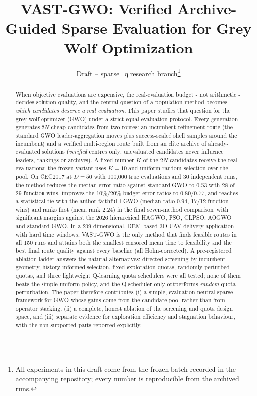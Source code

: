 \documentclass[journal]{IEEEtran}
\begin{document}
\title{VAST-GWO: Verified Archive-Guided Sparse Evaluation for Grey Wolf
Optimization}

\author{Draft -- sparse\_q research branch\thanks{All experiments in this
draft come from the frozen batch recorded in the accompanying repository;
every number is reproducible from the archived runs.}}

\maketitle

\begin{abstract}
When objective evaluations are expensive, the real-evaluation budget - not
arithmetic - decides solution quality, and the central question of a
population method becomes \emph{which candidates deserve a real evaluation}.
This paper studies that question for the grey wolf optimizer (GWO) under a
strict equal-evaluation protocol. Every generation generates $2N$ cheap
candidates from two routes: an incumbent-refinement route (the standard GWO
leader-aggregation moves plus success-scaled shell samples around the
incumbent) and a verified multi-region route built from an elite archive of
already-evaluated solutions (\emph{verified} centres only; unevaluated
candidates never influence leaders, rankings or archives). A fixed number
$K$ of the $2N$ candidates receive the real evaluations; the frozen variant
uses $K=10$ and uniform random selection over the pool. On CEC2017 at
$D=50$ with 100{,}000 true evaluations and 30 independent runs, the method
reduces the median error ratio against standard GWO to 0.53 with 28 of 29
function wins, improves the 10\%/20\%-budget error ratios to 0.80/0.77, and
reaches a statistical tie with the author-faithful I-GWO (median ratio
0.94, 17/12 function wins) and ranks first (mean rank 2.24) in the final
seven-method comparison, with significant margins against the 2026
hierarchical HAGWO, PSO, CLPSO, AOGWO and standard GWO. In a 209-dimensional,
DEM-based 3D UAV delivery application with hard time windows, VAST-GWO is the
only method that finds feasible routes in all 150 runs and attains both the
smallest censored mean time to feasibility and the best final route quality
against every baseline (all Holm-corrected). A pre-registered ablation ladder answers the natural alternatives:
directed screening by incumbent geometry, history-informed selection, fixed
exploration quotas, randomly perturbed quotas, and three lightweight
Q-learning quota schedulers were all tested; none of them beats the simple
uniform policy, and the Q scheduler only outperforms \emph{random} quota
perturbation. The paper therefore contributes (i) a simple, evaluation-neutral
sparse framework for GWO whose gains come from the candidate pool rather than
from operator stacking, (ii) a complete, honest ablation of the screening and
quota design space, and (iii) separate evidence for exploration efficiency
and stagnation behaviour, with the non-supported parts reported explicitly.
\end{abstract}
\end{document}
